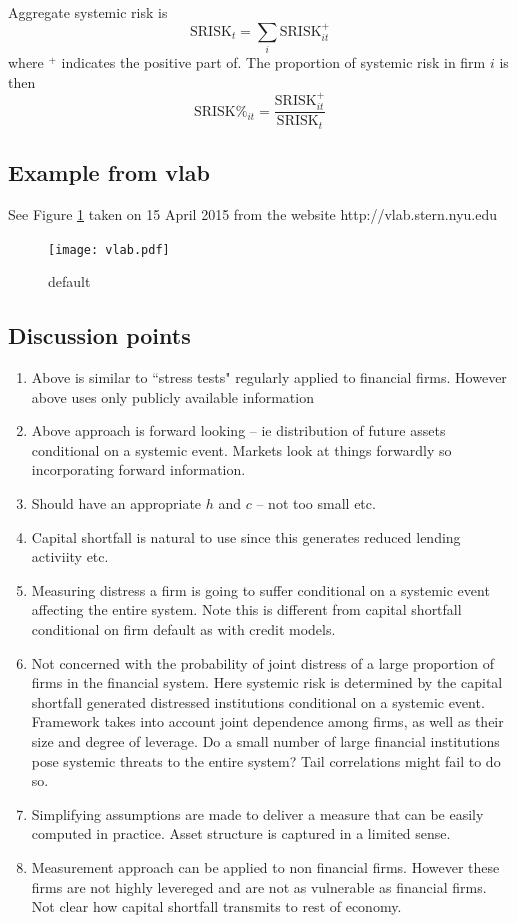 \documentclass[authoryear]{elsarticle}
\newcommand{\fref}[1]{Figure \ref{#1}}
\begin{document}
Aggregate systemic risk is 
$$
\mathrm{SRISK}_t = \sum_i \mathrm{SRISK}^+_{it}
$$
where $^+$ indicates the positive part of.   
   The proportion of systemic risk in firm $i$ is then
$$
\mathrm{SRISK\%}_{it} = \frac{\mathrm{SRISK}_{it}^+}{\mathrm{SRISK}_{t}}
$$ 

\subsection{Example from vlab}
See \fref{vlab} taken on 15 April 2015 from the website http://vlab.stern.nyu.edu

\begin{figure}[htbp]
\caption{default}\label{vlab}
\begin{center}
\texttt{[image: vlab.pdf]}
\end{center}
\end{figure}

\subsection{Discussion points}

\begin{enumerate}
\item  Above is similar to ``stress tests" regularly applied to financial firms.   However above uses only publicly available information
\item  Above approach is forward looking -- ie distribution of future assets conditional on a systemic event.  Markets look at things forwardly so incorporating forward information.
\item  Should have an appropriate $h$ and $c$ -- not too small etc.
\item  Capital shortfall is natural to use since this generates reduced lending activiity etc.
\item Measuring distress a firm is going to suffer conditional on a systemic event affecting the entire system.   Note this is different from capital shortfall conditional on firm default as with credit models.
\item Not concerned with the probability of joint distress of a large proportion of firms in the financial system.   Here systemic risk is determined by the capital shortfall generated distressed institutions conditional on a systemic event.  Framework takes into account joint dependence among firms, as well as their size and degree of leverage.   Do a small number of large financial institutions pose systemic threats to the entire system?  Tail correlations might fail to do so.
\item  Simplifying assumptions are made to deliver a measure that can be easily computed in practice.    Asset structure is captured in a limited sense.   
\item   Measurement approach can be applied to non financial firms.   However these firms are not highly levereged and are not as vulnerable as financial firms.    Not clear how capital shortfall transmits to rest of economy.   

\end{enumerate}
\end{document}
